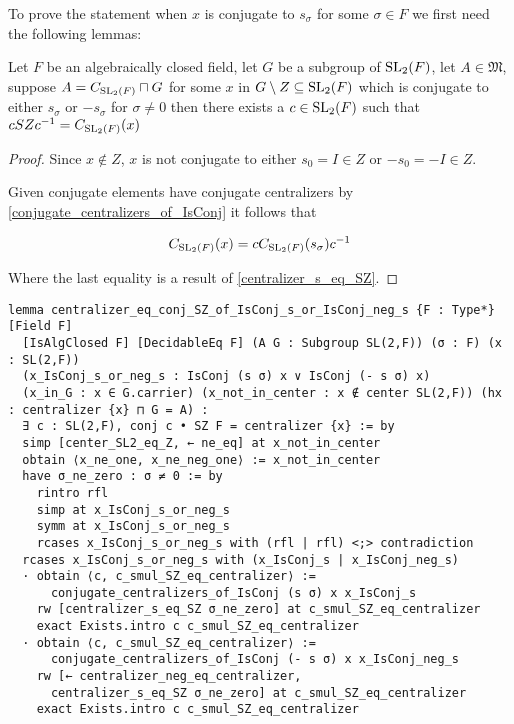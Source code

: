 To prove the statement when $x$ is conjugate to $s_\sigma$ for some $\sigma \in F$ we first need the following lemmas:

\begin{lemma}
  \label{MaximalAbelianSubgroup.centralizer_eq_conj_SZ_of_IsConj_s_or_IsConj_neg_s}
  \leanok

  Let $F$ be an algebraically closed field, let $G$ be a subgroup of $\operatorname{SL}_2(F)$, let $A \in \mathfrak{M}$, suppose $A = C_{\operatorname{SL}_2(F)}\sqcap G$ for some
  $x$ in $G \setminus Z \subseteq \operatorname{SL}_2(F)$ which is conjugate to either $s_\sigma$ or $-s_\sigma$ for $\sigma \ne 0$ then
  there exists a $c \in \operatorname{SL}_2(F)$ such that $cSZc^{-1} = C_{\operatorname{SL}_2(F)}(x)$
\end{lemma}
\begin{proof}
\leanok
Since $x \notin Z$, $x$ is not conjugate to either $s_0 = I \in Z$ or $-s_0 = -I \in Z$.

Given conjugate elements have conjugate centralizers by \ref{conjugate_centralizers_of_IsConj} it follows that 

\[
C_{\operatorname{SL}_2(F)}(x) = c C_{\operatorname{SL}_2(F)}(s_\sigma)c^{-1}
\]

Where the last equality is a result of \ref{centralizer_s_eq_SZ}.
\end{proof}
\begin{footnotesize}
\begin{verbatim}
lemma centralizer_eq_conj_SZ_of_IsConj_s_or_IsConj_neg_s {F : Type*} [Field F]
  [IsAlgClosed F] [DecidableEq F] (A G : Subgroup SL(2,F)) (σ : F) (x : SL(2,F))
  (x_IsConj_s_or_neg_s : IsConj (s σ) x ∨ IsConj (- s σ) x)
  (x_in_G : x ∈ G.carrier) (x_not_in_center : x ∉ center SL(2,F)) (hx : centralizer {x} ⊓ G = A) :
  ∃ c : SL(2,F), conj c • SZ F = centralizer {x} := by
  simp [center_SL2_eq_Z, ← ne_eq] at x_not_in_center
  obtain ⟨x_ne_one, x_ne_neg_one⟩ := x_not_in_center
  have σ_ne_zero : σ ≠ 0 := by
    rintro rfl
    simp at x_IsConj_s_or_neg_s
    symm at x_IsConj_s_or_neg_s
    rcases x_IsConj_s_or_neg_s with (rfl | rfl) <;> contradiction
  rcases x_IsConj_s_or_neg_s with (x_IsConj_s | x_IsConj_neg_s)
  · obtain ⟨c, c_smul_SZ_eq_centralizer⟩ :=
      conjugate_centralizers_of_IsConj (s σ) x x_IsConj_s
    rw [centralizer_s_eq_SZ σ_ne_zero] at c_smul_SZ_eq_centralizer
    exact Exists.intro c c_smul_SZ_eq_centralizer
  · obtain ⟨c, c_smul_SZ_eq_centralizer⟩ :=
      conjugate_centralizers_of_IsConj (- s σ) x x_IsConj_neg_s
    rw [← centralizer_neg_eq_centralizer,
      centralizer_s_eq_SZ σ_ne_zero] at c_smul_SZ_eq_centralizer
    exact Exists.intro c c_smul_SZ_eq_centralizer
\end{verbatim}
\end{footnotesize}

